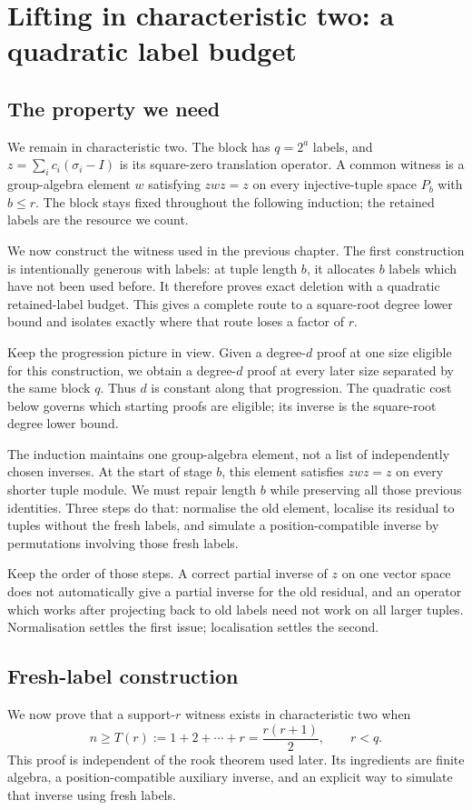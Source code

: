 \chapter{Lifting in characteristic two: a quadratic label budget}\label{tx:sec:quadratic-route}
\label{tx:ch:quadratic}
\section*{The property we need}
We remain in characteristic two. The block has $q=2^a$ labels,
and $z=\sum_i c_i(\sigma_i-I)$ is its square-zero translation
operator. A common witness is a group-algebra element $w$ satisfying
$zwz=z$ on every injective-tuple space $P_b$ with $b\le r$.
The block stays fixed throughout the following induction; the
retained labels are the resource we count.

We now construct the witness used in the previous chapter. The first
construction is intentionally generous with labels: at tuple length
$b$, it allocates $b$ labels which have not been used before. It
therefore proves exact deletion with a quadratic retained-label
budget. This gives a complete route to a square-root degree lower
bound and isolates exactly where that route loses a factor of $r$.

Keep the progression picture in view. Given a degree-$d$ proof at
one size eligible for this construction, we obtain a degree-$d$ proof
at every later size separated by the same block $q$. Thus $d$ is constant along
that progression. The quadratic cost below governs which starting
proofs are eligible; its inverse is the square-root degree lower bound.

The induction maintains one group-algebra element, not a list of
independently chosen inverses. At the start of stage $b$, this element
satisfies $zwz=z$ on every shorter tuple module. We must repair length
$b$ while preserving all those previous identities. Three steps do
that: normalise the old element, localise its residual to tuples
without the fresh labels, and simulate a position-compatible inverse
by permutations involving those fresh labels.

Keep the order of those steps. A correct partial inverse of $z$ on one
vector space does not automatically give a partial inverse for the old residual, and an
operator which works after projecting back to old labels need not
work on all larger tuples. Normalisation settles the first issue;
localisation settles the second.

\section{Fresh-label construction}\label{tx:sec:quadratic}
We now prove that a support-$r$ witness exists in characteristic two when
\[n\ge T(r):=1+2+\cdots+r=\frac{r(r+1)}2,\qquad r<q.\]
This proof is independent of the rook theorem used later. Its ingredients are finite algebra, a position-compatible auxiliary inverse, and an explicit way to simulate that inverse using fresh labels.

